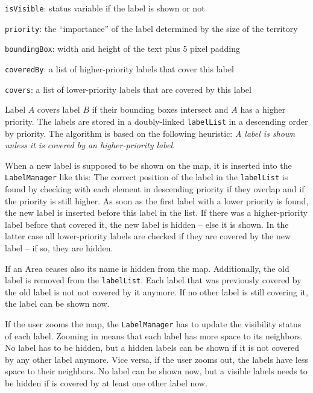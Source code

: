 \begin{compactitem}
  \item \texttt{isVisible}: status variable if the label is shown or not
  \item \texttt{priority}: the ``importance'' of the label determined by the size of the territory
  \item \texttt{boundingBox}: width and height of the text plus 5 pixel padding
  \item \texttt{coveredBy}: a list of higher-priority labels that cover this label
  \item \texttt{covers}: a list of lower-priority labels that are covered by this label
\end{compactitem}

Label $A$ covers label $B$ if their bounding boxes intersect and $A$ has a higher priority. The labels are stored in a doubly-linked \texttt{labelList} in a descending order by priority. The algorithm is based on the following heuristic: \emph{A label is shown unless it is covered by an higher-priority label}.

When a new label is supposed to be shown on the map, it is inserted into the \texttt{LabelManager} like this: The correct position of the label in the \texttt{labelList} is found by checking with each element in descending priority if they overlap and if the priority is still higher. As soon as the first label with a lower priority is found, the new label is inserted before this label in the list. If there was a higher-priority label before that covered it, the new label is hidden -- else it is shown. In the latter case all lower-priority labels are checked if they are covered by the new label -- if so, they are hidden.

If an Area ceases also its name is hidden from the map. Additionally, the old label is removed from the \texttt{labelList}. Each label that was previously covered by the old label is not not covered by it anymore. If no other label is still covering it, the label can be shown now.

If the user zooms the map, the \texttt{LabelManager} has to update the visibility status of each label. Zooming in  means that each label has more space to its neighbors. No label has to be hidden, but a hidden labels can be shown if it is not covered by any other label anymore. Vice versa, if the user zooms out, the labels have less space to their neighbors. No label can be shown now, but a visible labels needs to be hidden if is covered by at least one other label now.

